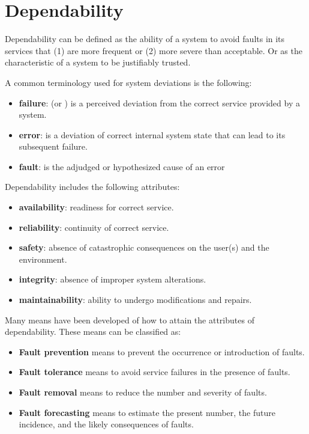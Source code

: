 \section{Dependability}
Dependability can be defined as the ability of a system to avoid faults in its services
that (1) are more frequent or (2) more severe than acceptable. Or as the characteristic of a system to be justifiably trusted.

A common terminology used for system deviations is the following: \cite{avizienis_basic_2004}

\begin{itemize}
  \item \textbf{failure}: (or ) is a perceived deviation from the correct service provided by a system.
  \item \textbf{error}: is a deviation of correct internal system state that can lead to its subsequent failure.
  \item \textbf{fault}: is the adjudged or
hypothesized cause of an error
\end{itemize}

Dependability includes the following attributes:\cite{avizienis_basic_2004}
\begin{itemize}
  \item \textbf{availability}: readiness for correct service.
  \item \textbf{reliability}: continuity of correct service.
  \item \textbf{safety}: absence of catastrophic consequences on the
user(s) and the environment.
  \item \textbf{integrity}: absence of improper system alterations.
  \item \textbf{maintainability}: ability to undergo modifications and repairs.
\end{itemize}


Many means have been developed of how to attain the attributes of dependability. These means can be classified as:

\begin{itemize}
  \item \textbf{Fault prevention} means to prevent the occurrence or introduction of faults.
  \item \textbf{Fault tolerance} means to avoid service failures in the presence of faults.
  \item \textbf{Fault removal} means to reduce the number and severity of faults.
  \item \textbf{Fault forecasting} means to estimate the present number, the future incidence, and the likely consequences of faults.
\end{itemize}


